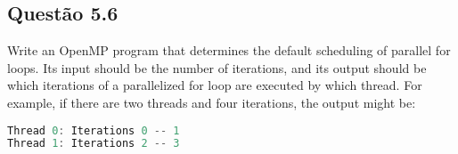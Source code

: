 
\subsection{Questão 5.6}

Write an OpenMP program that determines the default scheduling of parallel for loops. Its input should be the number of iterations, and its output should be which iterations of a parallelized for loop are executed by which thread. For example, if there are two threads and four iterations, the output might be:

\begin{lstlisting}[language=C]
Thread 0: Iterations 0 -- 1
Thread 1: Iterations 2 -- 3
\end{lstlisting}




